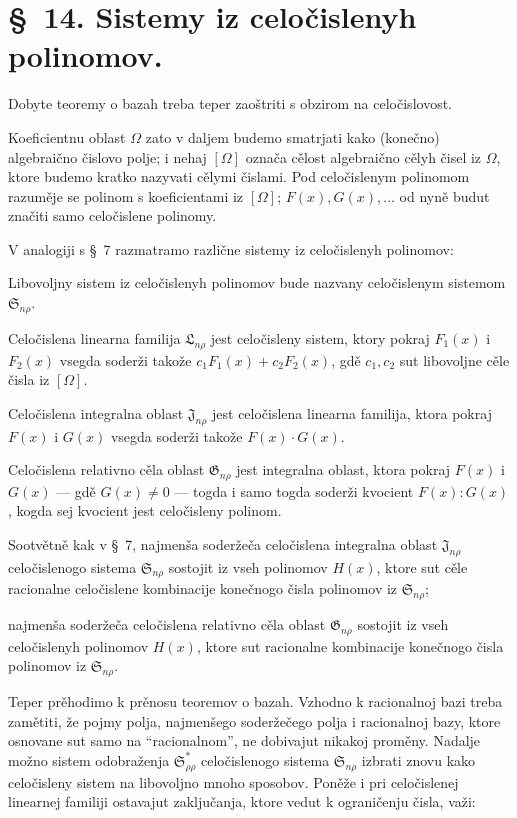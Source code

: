 \documentclass[11pt]{article}
\providecommand{\Ssys}{\mathfrak{S}}
\providecommand{\Jdom}{\mathfrak{J}}
\providecommand{\Gdom}{\mathfrak{G}}
\providecommand{\Lsys}{\mathfrak{L}}
\begin{document}
\section*{\S\ 14. Sistemy iz celočislenyh polinomov.}

Dobyte teoremy o bazah treba teper zaoštriti s obzirom na celočislovost.

Koeficientnu oblast $\Omega$ zato v daljem budemo smatrjati kako (konečno) algebraično čislovo polje; i nehaj $[\Omega]$ označa cělost algebraično cělyh čisel iz $\Omega$, ktore budemo kratko nazyvati cělymi čislami. Pod celočislenym polinomom razuměje se polinom s koeficientami iz $[\Omega]$; $F(x),G(x),\ldots$ od nyně budut značiti samo celočislene polinomy.

V analogiji s \S\ 7 razmatramo različne sistemy iz celočislenyh polinomov:

Libovoljny sistem iz celočislenyh polinomov bude nazvany celočislenym sistemom $\Ssys_{n\rho}$.

Celočislena linearna familija $\Lsys_{n\rho}$ jest celočisleny sistem, ktory pokraj $F_1(x)$ i $F_2(x)$ vsegda soderži takože $c_1F_1(x)+c_2F_2(x)$, gdě $c_1,c_2$ sut libovoljne cěle čisla iz $[\Omega]$.

Celočislena integralna oblast $\Jdom_{n\rho}$ jest celočislena linearna familija, ktora pokraj $F(x)$ i $G(x)$ vsegda soderži takože $F(x)\cdot G(x)$.

Celočislena relativno cěla oblast $\Gdom_{n\rho}$ jest integralna oblast, ktora pokraj $F(x)$ i $G(x)$ --- gdě $G(x)\ne0$ --- togda i samo togda soderži kvocient $F(x):G(x)$, kogda sej kvocient jest celočisleny polinom.

Sootvětně kak v \S\ 7, najmenša soderžeča celočislena integralna oblast $\Jdom_{n\rho}$ celočislenogo sistema $\Ssys_{n\rho}$ sostojit iz vseh polinomov $H(x)$, ktore sut cěle racionalne celočislene kombinacije konečnogo čisla polinomov iz $\Ssys_{n\rho}$;

najmenša soderžeča celočislena relativno cěla oblast $\Gdom_{n\rho}$ sostojit iz vseh celočislenyh polinomov $H(x)$, ktore sut racionalne kombinacije konečnogo čisla polinomov iz $\Ssys_{n\rho}$.

Teper prěhodimo k prěnosu teoremov o bazah. Vzhodno k racionalnoj bazi treba zamětiti, že pojmy polja, najmenšego soderžečego polja i racionalnoj bazy, ktore osnovane sut samo na ``racionalnom'', ne dobivajut nikakoj proměny. Nadalje možno sistem odobraženja $\Ssys^*_{\rho\rho}$ celočislenogo sistema $\Ssys_{n\rho}$ izbrati znovu kako celočisleny sistem na libovoljno mnoho sposobov. Poněže i pri celočislenej linearnej familiji ostavajut zaključanja, ktore vedut k ograničenju čisla, važi:
\end{document}

